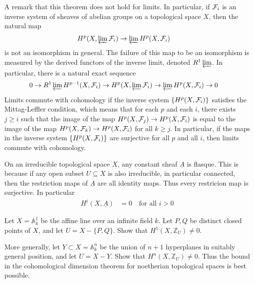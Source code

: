 \documentclass[12pt]{article}
\begin{document}
A remark that this theorem does not hold for limits. In particular, if ${\mathcal{F}}_i$ is an inverse system of sheaves of abelian groups on a topological space $X$, then the natural map
\begin{align*}
    H^p(X, \varprojlim {\mathcal{F}}_i) & \to \varprojlim H^p(X, {\mathcal{F}}_i)
\end{align*}is not an isomorphism in general. The failure of this map to be an isomorphism is measured by the derived functors of the inverse limit, denoted $R^1 \varprojlim$. In particular, there is a natural exact sequence
\begin{align*}
    0 & \to R^1 \varprojlim H^{p-1}(X, {\mathcal{F}}_i) \to H^p(X, \varprojlim {\mathcal{F}}_i) \to \varprojlim H^p(X, {\mathcal{F}}_i) \to 0
\end{align*} Limits commute with cohomology if the inverse system $\{H^p(X, {\mathcal{F}}_i)\}$ satisfies the Mittag-Leffler condition, which means that for each $p$ and each $i$, there exists $j \ge i$ such that the image of the map $H^p(X, {\mathcal{F}}_j) \to H^p(X, {\mathcal{F}}_i)$ is equal to the image of the map $H^p(X, {\mathcal{F}}_k) \to H^p(X, {\mathcal{F}}_i)$ for all $k \ge j$. In particular, if the maps in the inverse system $\{H^p(X, {\mathcal{F}}_i)\}$ are surjective for all $p$ and all $i$, then limits commute with cohomology.

\begin{example}
    On an irreducible topological space $X$, any constant sheaf $\underline{A}$ is flasque. This is because if any open subset $U \subseteq X$ is also irreducible, in particular connected, then the restriction maps of $\underline{A}$ are all identity maps. Thus every restricion map is surjective. In particular \begin{align*}
        H^i(X, \underline{A}) & = 0 \quad \text{for all } i > 0
    \end{align*}
\end{example}
\begin{exercise}
    Let $X=\mathbb A^1_k$ be the affine line over an infinite field $k$.
    Let $P,Q$ be distinct closed points of $X$, and let
    $
        U=X-\{P,Q\}.
    $
    Show that
    $
        H^1(X,\mathbb Z_U)\neq 0.
    $

    More generally, let $Y\subset X=\mathbb A^n_k$ be the union of $n+1$
    hyperplanes in suitably general position, and let
    $
        U=X-Y.
    $
    Show that
    $
        H^n(X,\mathbb Z_U)\neq 0.
    $
    Thus the bound in the cohomological dimension theorem for noetherian
    topological spaces is best possible.
\end{exercise}
\end{document}
